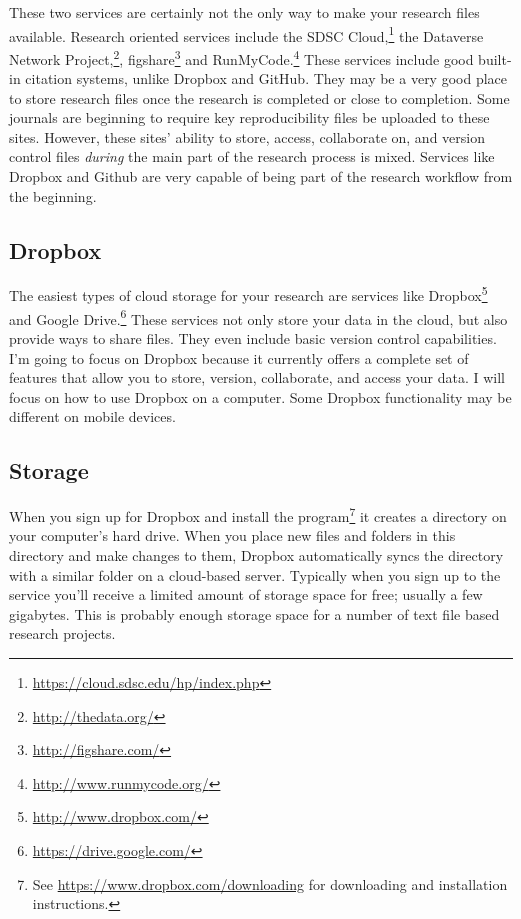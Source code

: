 These two services are certainly not the only way to make your research files available. Research oriented services include the SDSC Cloud,\footnote{\url{https://cloud.sdsc.edu/hp/index.php}} the Dataverse Network Project,\footnote{\url{http://thedata.org/}}, figshare\footnote{\url{http://figshare.com/}} and RunMyCode.\footnote{\url{http://www.runmycode.org/}} These services include good built-in citation systems, unlike Dropbox and GitHub. They may be a very good place to store research files once the research is completed or close to completion. Some journals are beginning to require key reproducibility files be uploaded to these sites. However, these sites' ability to store, access, collaborate on, and version control files \emph{during} the main part of the research process is mixed. Services like Dropbox and Github are very capable of being part of the research workflow from the beginning.

\subsection{Dropbox}

The easiest types of cloud storage for your research are services like Dropbox\footnote{\url{http://www.dropbox.com/}} and Google  Drive.\footnote{\url{https://drive.google.com/}} These services not only store your data in the cloud, but also provide ways to share files. They even include basic version control capabilities. I'm going to focus on Dropbox because it currently offers a complete set of features that allow you to store, version, collaborate, and access your data. I will focus on how to use Dropbox on a computer. Some Dropbox functionality may be different on mobile devices.

\subsection{Storage}

When you sign up for Dropbox and install the program\footnote{See \url{https://www.dropbox.com/downloading} for downloading and installation instructions.} it creates a directory on your computer's hard drive. When you place new files and folders in this directory and make changes to them, Dropbox automatically syncs the directory with a similar folder on a cloud-based server. Typically when you sign up to the service you'll receive a limited amount of storage space for free; usually a few gigabytes. This is probably enough storage space for a number of text file based research projects.

